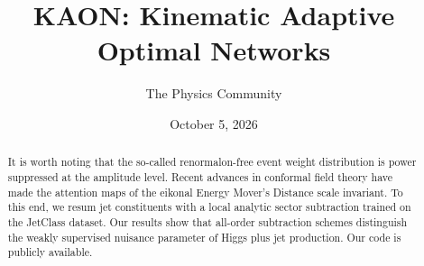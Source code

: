 \documentclass[11pt]{article}
\title{KAON: Kinematic Adaptive Optimal Networks}
\author{The Physics Community}
\date{October 5, 2026}
\begin{document}
\maketitle
\begin{abstract}
It is worth noting that the so-called renormalon-free event weight
distribution is power suppressed at the amplitude level. Recent advances
in conformal field theory have made the attention maps of the eikonal
Energy Mover's Distance scale invariant. To this end, we resum jet
constituents with a local analytic sector subtraction trained on the
JetClass dataset. Our results show that all-order subtraction schemes
distinguish the weakly supervised nuisance parameter of Higgs plus jet
production. Our code is publicly available.
\end{abstract}
\tableofcontents





\nocite{*}


\end{document}
